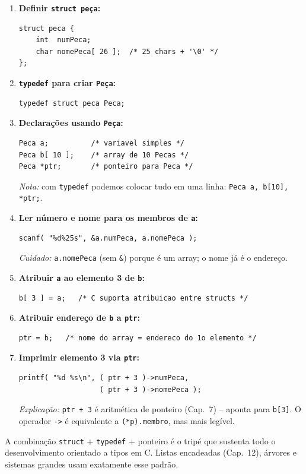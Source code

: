\documentclass[12pt,a4paper]{article}
\begin{document}
\begin{respostabox}
\begin{enumerate}[label=\textbf{\alph*)}]

\item \textbf{Definir \texttt{struct peça}:}
\begin{lstlisting}
struct peca {
    int  numPeca;
    char nomePeca[ 26 ];  /* 25 chars + '\0' */
};
\end{lstlisting}

\item \textbf{\texttt{typedef} para criar \texttt{Peça}:}
\begin{lstlisting}
typedef struct peca Peca;
\end{lstlisting}

\item \textbf{Declarações usando \texttt{Peça}:}
\begin{lstlisting}
Peca a;          /* variavel simples */
Peca b[ 10 ];    /* array de 10 Pecas */
Peca *ptr;       /* ponteiro para Peca */
\end{lstlisting}
\textit{Nota:} com \texttt{typedef} podemos colocar tudo em uma linha:
\texttt{Peca a, b[10], *ptr;}.

\item \textbf{Ler número e nome para os membros de \texttt{a}:}
\begin{lstlisting}
scanf( "%d%25s", &a.numPeca, a.nomePeca );
\end{lstlisting}
\textit{Cuidado:} \texttt{a.nomePeca} (sem \texttt{\&}) porque é um array;
o nome já é o endereço.

\item \textbf{Atribuir \texttt{a} ao elemento 3 de \texttt{b}:}
\begin{lstlisting}
b[ 3 ] = a;   /* C suporta atribuicao entre structs */
\end{lstlisting}

\item \textbf{Atribuir endereço de \texttt{b} a \texttt{ptr}:}
\begin{lstlisting}
ptr = b;   /* nome do array = endereco do 1o elemento */
\end{lstlisting}

\item \textbf{Imprimir elemento 3 via \texttt{ptr}:}
\begin{lstlisting}
printf( "%d %s\n", ( ptr + 3 )->numPeca,
                   ( ptr + 3 )->nomePeca );
\end{lstlisting}

\textit{Explicação:} \texttt{ptr + 3} é aritmética de ponteiro (Cap.~7) -- aponta
para \texttt{b[3]}. O operador \texttt{->} é equivalente a \texttt{(*p).membro},
mas mais legível.
\end{enumerate}

\begin{boaprática}
  A combinação \texttt{struct} + \texttt{typedef} + ponteiro é o tripé que
  sustenta todo o desenvolvimento orientado a tipos em C. Listas encadeadas
  (Cap.~12), árvores e sistemas grandes usam exatamente esse padrão.
\end{boaprática}
\end{respostabox}
\end{document}
